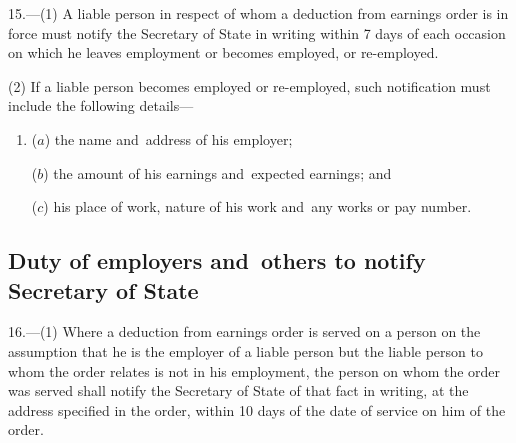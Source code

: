 \documentclass[12pt,a4paper]{article}
\begin{document}
%
%
%

15.---(1)  A liable person in respect of whom a deduction from earnings order is in force must notify the Secretary of State in writing within 7 days of each occasion on which he leaves employment or becomes employed, or re-employed.

(2) If a liable person becomes employed or re-employed, such notification must include the following details—
\begin{enumerate}\item[]
($a$) the name and~address of his employer;

($b$) the amount of his earnings and~expected earnings; and

($c$) his place of work, nature of his work and~any works or pay number.
\end{enumerate}


\subsection[16. Duty of employers and~others to notify Secretary of State]{Duty of employers and~others to notify Secretary of State}

16.—(1) Where a deduction from earnings order is served on a person on the assumption that he is the employer of a liable person but the liable person to whom the order relates is not in his employment, the person on whom the order was served shall notify the Secretary of State of that fact in writing, at the address specified in the order, within 10 days of the date of service on him of the order.
\end{document}
